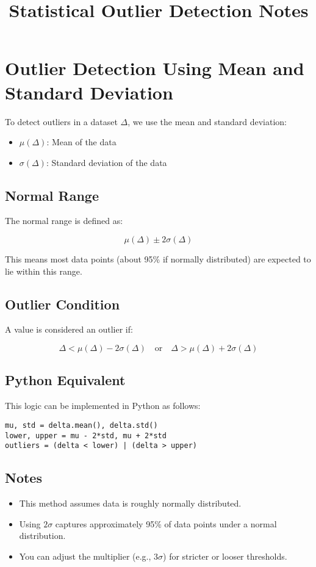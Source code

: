 \documentclass[12pt]{article}
\title{Statistical Outlier Detection Notes}
\author{}
\date{}
\begin{document}
\maketitle

\section*{Outlier Detection Using Mean and Standard Deviation}

To detect outliers in a dataset $\Delta$, we use the mean and standard deviation:

\begin{itemize}
    \item $\mu(\Delta)$: Mean of the data
    \item $\sigma(\Delta)$: Standard deviation of the data
\end{itemize}

\subsection*{Normal Range}

The normal range is defined as:

\[
\mu(\Delta) \pm 2\sigma(\Delta)
\]

This means most data points (about 95\% if normally distributed) are expected to lie within this range.

\subsection*{Outlier Condition}

A value is considered an outlier if:

\[
\Delta < \mu(\Delta) - 2\sigma(\Delta) \quad \text{or} \quad \Delta > \mu(\Delta) + 2\sigma(\Delta)
\]

\subsection*{Python Equivalent}

This logic can be implemented in Python as follows:

\begin{verbatim}
mu, std = delta.mean(), delta.std()
lower, upper = mu - 2*std, mu + 2*std
outliers = (delta < lower) | (delta > upper)
\end{verbatim}

\subsection*{Notes}

\begin{itemize}
    \item This method assumes data is roughly normally distributed.
    \item Using $2\sigma$ captures approximately 95\% of data points under a normal distribution.
    \item You can adjust the multiplier (e.g., $3\sigma$) for stricter or looser thresholds.
\end{itemize}
\end{document}
